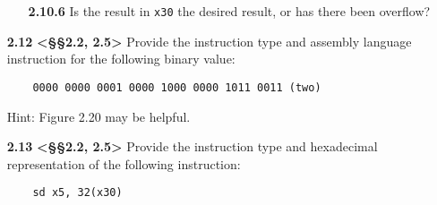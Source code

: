 \documentclass[11pt]{article}
\begin{document}
\begin{enumerate}
\begin{enumerate}
        \item[\textbf{2.10.6}] Is the result in \texttt{x30} the desired result, or has there been 
        overflow?
    \end{enumerate}

    \item[\textbf{2.12}] \textbf{<§§2.2, 2.5>} Provide the instruction type and assembly language 
    instruction for the following binary value:
    \begin{verbatim}
    0000 0000 0001 0000 1000 0000 1011 0011 (two)
    \end{verbatim}
    Hint: Figure 2.20 may be helpful.
    
    \item[\textbf{2.13}] \textbf{<§§2.2, 2.5>} Provide the instruction type and hexadecimal representation 
    of the following instruction:
    \begin{verbatim}
    sd x5, 32(x30)
    \end{verbatim}

\end{enumerate}
\end{document}

